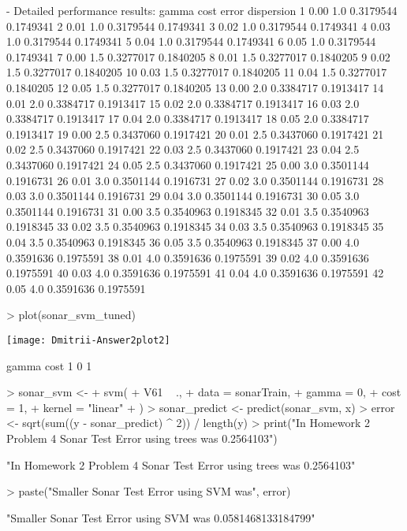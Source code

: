 \documentclass{article}
\begin{document}
\begin{Schunk}
\begin{Soutput}
- Detailed performance results:
   gamma cost     error dispersion
1   0.00  1.0 0.3179544  0.1749341
2   0.01  1.0 0.3179544  0.1749341
3   0.02  1.0 0.3179544  0.1749341
4   0.03  1.0 0.3179544  0.1749341
5   0.04  1.0 0.3179544  0.1749341
6   0.05  1.0 0.3179544  0.1749341
7   0.00  1.5 0.3277017  0.1840205
8   0.01  1.5 0.3277017  0.1840205
9   0.02  1.5 0.3277017  0.1840205
10  0.03  1.5 0.3277017  0.1840205
11  0.04  1.5 0.3277017  0.1840205
12  0.05  1.5 0.3277017  0.1840205
13  0.00  2.0 0.3384717  0.1913417
14  0.01  2.0 0.3384717  0.1913417
15  0.02  2.0 0.3384717  0.1913417
16  0.03  2.0 0.3384717  0.1913417
17  0.04  2.0 0.3384717  0.1913417
18  0.05  2.0 0.3384717  0.1913417
19  0.00  2.5 0.3437060  0.1917421
20  0.01  2.5 0.3437060  0.1917421
21  0.02  2.5 0.3437060  0.1917421
22  0.03  2.5 0.3437060  0.1917421
23  0.04  2.5 0.3437060  0.1917421
24  0.05  2.5 0.3437060  0.1917421
25  0.00  3.0 0.3501144  0.1916731
26  0.01  3.0 0.3501144  0.1916731
27  0.02  3.0 0.3501144  0.1916731
28  0.03  3.0 0.3501144  0.1916731
29  0.04  3.0 0.3501144  0.1916731
30  0.05  3.0 0.3501144  0.1916731
31  0.00  3.5 0.3540963  0.1918345
32  0.01  3.5 0.3540963  0.1918345
33  0.02  3.5 0.3540963  0.1918345
34  0.03  3.5 0.3540963  0.1918345
35  0.04  3.5 0.3540963  0.1918345
36  0.05  3.5 0.3540963  0.1918345
37  0.00  4.0 0.3591636  0.1975591
38  0.01  4.0 0.3591636  0.1975591
39  0.02  4.0 0.3591636  0.1975591
40  0.03  4.0 0.3591636  0.1975591
41  0.04  4.0 0.3591636  0.1975591
42  0.05  4.0 0.3591636  0.1975591
\end{Soutput}
\end{Schunk}
\begin{Schunk}
\begin{Sinput}
> plot(sonar_svm_tuned)
\end{Sinput}
\end{Schunk}
\texttt{[image: Dmitrii-Answer2plot2]}
\begin{Schunk}
\begin{Soutput}
  gamma cost
1     0    1
\end{Soutput}
\begin{Sinput}
> sonar_svm <-
+   svm(
+     V61 ~ .,
+     data = sonarTrain,
+     gamma = 0,
+     cost = 1,
+     kernel = "linear"
+   )
> sonar_predict <- predict(sonar_svm, x)
> error <- sqrt(sum((y - sonar_predict) ^ 2)) / length(y)
> print("In Homework 2 Problem 4 Sonar Test Error using trees was 0.2564103")
\end{Sinput}
\begin{Soutput}
[1] "In Homework 2 Problem 4 Sonar Test Error using trees was 0.2564103"
\end{Soutput}
\begin{Sinput}
> paste("Smaller Sonar Test Error using SVM was", error)
\end{Sinput}
\begin{Soutput}
[1] "Smaller Sonar Test Error using SVM was 0.0581468133184799"
\end{Soutput}
\end{Schunk}
\end{document}
